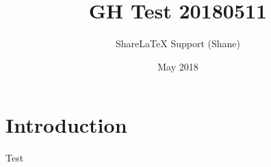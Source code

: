 \documentclass{article}
\title{GH Test 20180511}
\author{ShareLaTeX Support (Shane)}
\date{May 2018}
\begin{document}
\maketitle

\section{Introduction}

Test
\end{document}
